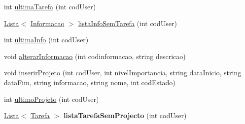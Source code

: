 \begin{DoxyCompactItemize}
\item 
int \hyperlink{class_b_dados_a0a0a16a40a9c6fb68936107a768ea05a}{ultima\-Tarefa} (int cod\-User)
\item 
\hyperlink{class_lista}{Lista}$<$ \hyperlink{class_informacao}{Informacao} $>$ \hyperlink{class_b_dados_af581b477709070c65d8845404b7cfad1}{lista\-Info\-Sem\-Tarefa} (int cod\-User)
\item 
int \hyperlink{class_b_dados_a455d0a1f851f729e0c4ddfa9f8741302}{ultima\-Info} (int cod\-User)
\item 
void \hyperlink{class_b_dados_a4173f53d1db4868632b798ebb5240227}{alterar\-Informacao} (int codinformacao, string descricao)
\item 
void \hyperlink{class_b_dados_afacf52783af230ebfad53941f733de68}{inserir\-Projeto} (int cod\-User, int nivel\-Importancia, string data\-Inicio, string data\-Fim, string informacao, string nome, int cod\-Estado)
\item 
int \hyperlink{class_b_dados_a693c18c19073b594749048b89a0e5f20}{ultimo\-Projeto} (int cod\-User)
\item 
\hypertarget{class_b_dados_a5d09342d7f32656c7816811d0deee4e7}{\hyperlink{class_lista}{Lista}$<$ \hyperlink{class_tarefa}{Tarefa} $>$ {\bfseries lista\-Tarefa\-Sem\-Projecto} (int cod\-User)}\label{class_b_dados_a5d09342d7f32656c7816811d0deee4e7}


\end{DoxyCompactItemize}
